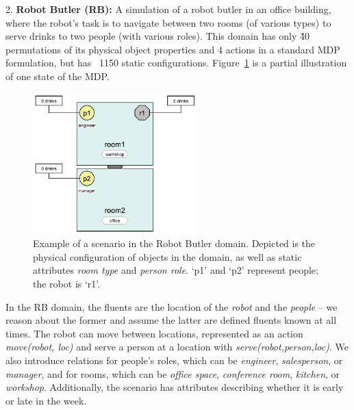 



2. \textbf{Robot Butler (RB):} 
A simulation of a robot butler in an office building, where the robot's task is 
to navigate between two rooms (of various types) to serve drinks to two people 
(with various roles). This domain has only \~40 permutations of its physical 
object properties and 4 actions in a standard MDP formulation, but has ~1150 
static configurations. Figure~\ref{fig:robotbutler} is a partial illustration 
of one state of the MDP. 

\begin{figure}[t]
  \centerline{\includegraphics[width=2.5in]{robot-butler-domain}}
  \caption{Example of a scenario in the Robot Butler domain. Depicted is the 
  physical configuration of objects in the domain, as well as static attributes 
  \textit{room type} and \textit{person role}. `p1' and `p2' represent people; 
  the robot is `r1'.}
\label{fig:robotbutler} 
\vspace{1mm}
\end{figure}




In the RB domain, the fluents are the location of the \textit{robot} and the 
\textit{people} -- we reason about the former and assume the latter are defined 
fluents known at all times. The robot can move between locations, represented 
as an action \textit{move(robot, loc)} and serve a person at a location with 
\textit{serve(robot,person,loc)}. 
We also introduce relations for people's roles, which can be \textit{engineer}, 
\textit{salesperson}, or \textit{manager}, and for rooms, which can be 
\textit{office space}, \textit{conference room}, \textit{kitchen}, or 
\textit{workshop}. Additionally, the scenario has attributes describing whether 
it is early or late in the week. 

